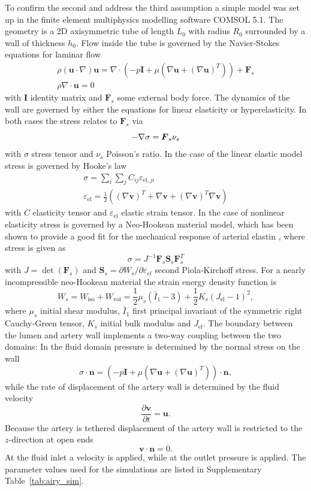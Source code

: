 \documentclass{frontiers_suppmat} %
\newcommand{\beq}{\begin{equation}}
\newcommand{\eeq}{\end{equation}}
\newcommand{\dd}{\partial}
\newcommand{\vareps}{\varepsilon}
\newcommand{\vel}{\boldsymbol{u}}
\newcommand{\disp}{\boldsymbol{v}}
\newcommand{\norm}{\boldsymbol{n}}
\begin{document}
To confirm the second and address the third assumption a simple model was set up in the finite element multiphysics modelling software COMSOL 5.1. The geometry is a 2D axisymmetric tube of length $L_0$ with radius $R_0$ surrounded by a wall of thickness $h_0$. Flow inside the tube is governed by the Navier-Stokes equations for laminar flow
\begin{gather}
\rho (\vel \cdot \nabla) \vel = \nabla \cdot \left( -p \boldsymbol{I} + \mu \left( \nabla \vel + (\nabla \vel)^T \right) \right) + \boldsymbol{F}_s\\
\rho \nabla \cdot \vel = 0
\end{gather}
with $\boldsymbol{I}$ identity matrix and $\boldsymbol{F}_s$ some external body force. The dynamics of the wall are governed by either the equations for linear elasticity or hyperelasticity. In both cases the stress relates to $\boldsymbol{F}_s$ via
\beq
-\nabla \sigma = \boldsymbol{F}_s \nu_s\\
\eeq
with $\sigma$ stress tensor and $\nu_s$ Poisson's ratio. In the case of the linear elastic model stress is governed by Hooke's law
\begin{gather}
\sigma = \sum_i \sum_j C_{ij} \vareps_{\text{el},ji}\\
\vareps_{\text{el}} = \frac{1}{2} \left( (\nabla \disp)^T + \nabla \disp + (\nabla \disp)^T \nabla \disp \right) 
\end{gather}
with $C$ elasticity tensor and $\vareps_{\text{el}}$ elastic strain tensor. In the case of nonlinear elasticity stress is governed by a Neo-Hookean material model, which has been shown to provide a good fit for the mechanical response of arterial elastin \cite{Holzapfel1998,Gundiah2007}, where stress is given as
\beq
\sigma = J^{-1} \boldsymbol{F}_s \boldsymbol{S}_s \boldsymbol{F}_s^T
\eeq
with $J = \det(\boldsymbol{F}_s)$ and $\boldsymbol{S}_s = \dd W_s / \dd \vareps_{el}$ second Piola-Kirchoff stress. For a nearly incompressible neo-Hookean material the strain energy density function is
\beq
W_s = W_{\text{iso}} + W_{\text{vol}} = \frac{1}{2} \mu_s (\bar{I}_1 - 3) + \frac{1}{2} K_s (J_{\text{el}} - 1)^2,
\eeq
where $\mu_s$ initial shear modulus, $\bar{I}_1$ first principal invariant of the symmetric right Cauchy-Green tensor, $K_s$ initial bulk modulus and $J_{\text{el}}$. The boundary between the lumen and artery wall implements a two-way coupling between the two domains: In the fluid domain pressure is determined by the normal stress on the wall
\beq
\sigma \cdot \norm = \left( -p \boldsymbol{I} + \mu \left( \nabla \vel + (\nabla \vel)^T \right) \right) \cdot \norm,
\eeq
while the rate of displacement of the artery wall is determined by the fluid velocity
\beq
\frac{\dd \disp}{\dd t} = \vel.
\eeq
Because the artery is tethered displacement of the artery wall is restricted to the $z$-direction at open ends
\beq
\disp \cdot \norm = 0.
\eeq
At the fluid inlet a velocity is applied, while at the outlet pressure is applied. The parameter values used for the simulations are listed in Supplementary Table~\ref{tab:airy_sim}.
\end{document}
